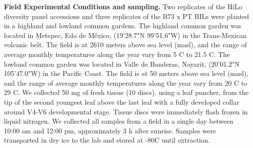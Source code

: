 \documentclass[9pt,twocolumn,twoside,lineno]{BioRxiv}
\begin{document}
\textbf{Field Experimental Conditions and sampling.} 
Two replicates of the HiLo diversity panel accessions and three replicates of the B73 x PT BILs were planted in a highland and lowland common gardens. 
The highland common garden was located in Metepec, Edo de México, (19'28.7"N 99'51.6"W) in the Trans-Mexican volcanic belt. 
The field is at 2610 meters above sea level (masl), and the range of average monthly temperatures along the year vary from 5 \degree C to 21.5 \degree C.  
The lowland common garden was located in Valle de Banderas, Nayarit, (20'01.2"N 105'47.0"W) in the Pacific Coast. 
The field is at 50 meters above sea level (masl), and the range of average monthly temperatures along the year vary from 20 \degree C to 29 \degree C.
We collected 50 mg of fresh tissue (10 discs), using a leaf puncher, from the tip of the second youngest leaf above the last leaf with a fully developed collar around V4-V6 developmental stage. 
Tissue discs were immediately flash frozen in liquid nitrogen. 
We collected all samples from a field in a single day between 10:00 am and 12:00 pm, approximately 3 h after sunrise. Samples were transported in dry ice to the lab and stored at -80\degree C until extraction. 
\end{document}
